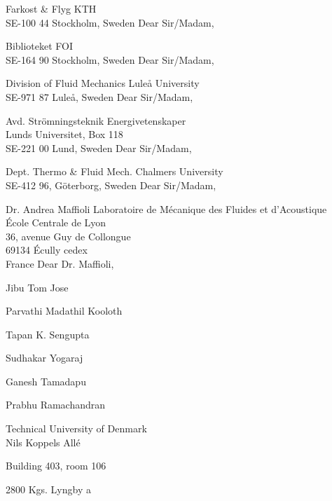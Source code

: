 
%
Farkost \& Flyg
KTH\\SE-100 44 Stockholm, Sweden
Dear Sir/Madam,

%
Biblioteket
FOI\\SE-164 90 Stockholm, Sweden
Dear Sir/Madam,

Division of Fluid Mechanics
Lule\r{a} University\\SE-971 87 Lule\aa, Sweden
Dear Sir/Madam,

Avd. Str\"omningsteknik
Energivetenskaper\\Lunds Universitet, Box 118\\SE-221 00 Lund, Sweden
Dear Sir/Madam,

Dept. Thermo \& Fluid Mech.
Chalmers University\\SE-412 96, G\"oterborg, Sweden
Dear Sir/Madam,

%

Dr. Andrea Maffioli
Laboratoire de Mécanique des Fluides et d’Acoustique\\École Centrale de Lyon\\36, avenue Guy de Collongue\\69134 Écully cedex\\France
Dear Dr. Maffioli,

%

Jibu Tom Jose


Parvathi Madathil Kooloth


Tapan K. Sengupta


Sudhakar Yogaraj


Ganesh Tamadapu


Prabhu Ramachandran


%

Technical University of Denmark\\

Nils Koppels Allé

Building 403, room 106

2800 Kgs. Lyngby
a

